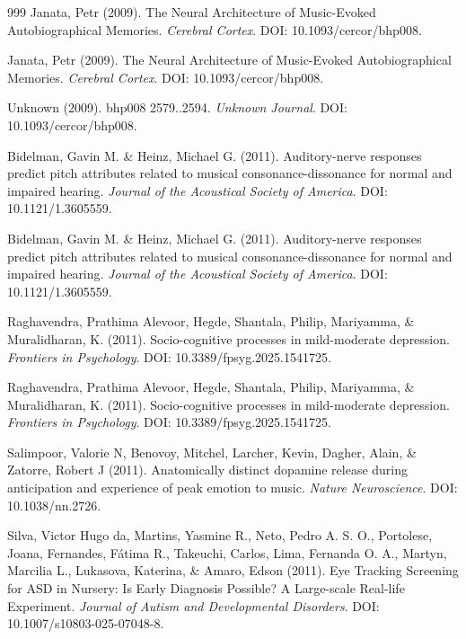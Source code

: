 \documentclass[9pt,onecolumn]{article}
\begin{document}
\begin{thebibliography}{999}
Janata, Petr (2009). The Neural Architecture of Music-Evoked Autobiographical Memories. \textit{Cerebral Cortex}. DOI: 10.1093/cercor/bhp008.

Janata, Petr (2009). The Neural Architecture of Music-Evoked Autobiographical Memories. \textit{Cerebral Cortex}. DOI: 10.1093/cercor/bhp008.

Unknown (2009). bhp008 2579..2594. \textit{Unknown Journal}. DOI: 10.1093/cercor/bhp008.

Bidelman, Gavin M. \& Heinz, Michael G. (2011). Auditory-nerve responses predict pitch attributes related to musical consonance-dissonance for normal and impaired hearing. \textit{Journal of the Acoustical Society of America}. DOI: 10.1121/1.3605559.

Bidelman, Gavin M. \& Heinz, Michael G. (2011). Auditory-nerve responses predict pitch attributes related to musical consonance-dissonance for normal and impaired hearing. \textit{Journal of the Acoustical Society of America}. DOI: 10.1121/1.3605559.

Raghavendra, Prathima Alevoor, Hegde, Shantala, Philip, Mariyamma, \& Muralidharan, K. (2011). Socio-cognitive processes in mild-moderate depression. \textit{Frontiers in Psychology}. DOI: 10.3389/fpsyg.2025.1541725.

Raghavendra, Prathima Alevoor, Hegde, Shantala, Philip, Mariyamma, \& Muralidharan, K. (2011). Socio-cognitive processes in mild-moderate depression. \textit{Frontiers in Psychology}. DOI: 10.3389/fpsyg.2025.1541725.

Salimpoor, Valorie N, Benovoy, Mitchel, Larcher, Kevin, Dagher, Alain, \& Zatorre, Robert J (2011). Anatomically distinct dopamine release during anticipation and experience of peak emotion to music. \textit{Nature Neuroscience}. DOI: 10.1038/nn.2726.

Silva, Victor Hugo da, Martins, Yasmine R., Neto, Pedro A. S. O., Portolese, Joana, Fernandes, Fátima R., Takeuchi, Carlos, Lima, Fernanda O. A., Martyn, Marcilia L., Lukasova, Katerina, \& Amaro, Edson (2011). Eye Tracking Screening for ASD in Nursery: Is Early Diagnosis Possible? A Large-scale Real-life Experiment. \textit{Journal of Autism and Developmental Disorders}. DOI: 10.1007/s10803-025-07048-8.


\end{thebibliography}
\end{document}
